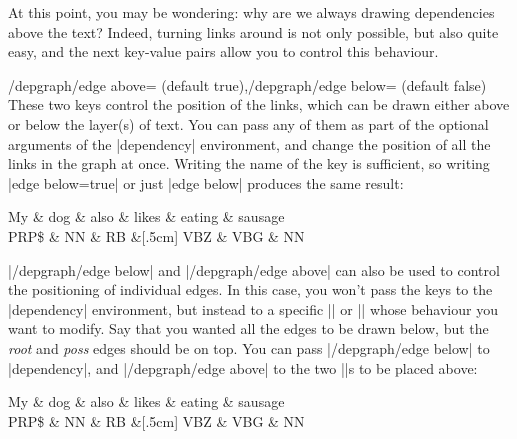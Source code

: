 \documentclass[a4paper]{ltxdoc}
\begin{document}
At this point, you may be wondering: why are we always drawing dependencies above the text? Indeed, turning links around is not only possible, but also quite easy, and the next key-value pairs allow you to control this behaviour.

\begin{keylist}{/depgraph/edge above= (default true),/depgraph/edge below= (default false)}
   These two keys control the position of the links, which can be drawn either above or below the layer(s) of text. You can pass any of them as part of the optional arguments of the |dependency| environment, and change the position of all the links in the graph at once. Writing the name of the key is sufficient, so writing |edge below=true| or just |edge below| produces the same result:
\begin{codeexample}[]
\begin{dependency}
   \begin{deptext}[column sep=.7cm]
      My \& dog \& also \& likes \& eating \& sausage \\
      PRP\$ \& NN \& RB \&[.5cm] VBZ \& VBG \& NN \\
   \end{deptext}
\end{dependency}
\end{codeexample}
|/depgraph/edge below| and |/depgraph/edge above| can also be used to control the positioning of individual edges. In this case, you won't pass the keys to the |dependency| environment, but instead to a specific |\depedge| or |\deproot| whose behaviour you want to modify.
Say that you wanted all the edges to be drawn below, but the \emph{root} and \emph{poss} edges should be on top. You can pass |/depgraph/edge below| to |dependency|, and |/depgraph/edge above| to the two |\depedge|s to be placed above:
\begin{codeexample}[]
\begin{dependency}
   \begin{deptext}[column sep=.7cm]
      My \& dog \& also \& likes \& eating \& sausage \\
      PRP\$ \& NN \& RB \&[.5cm] VBZ \& VBG \& NN \\
   \end{deptext}
\end{dependency}
\end{codeexample}
\end{keylist}
\end{document}

